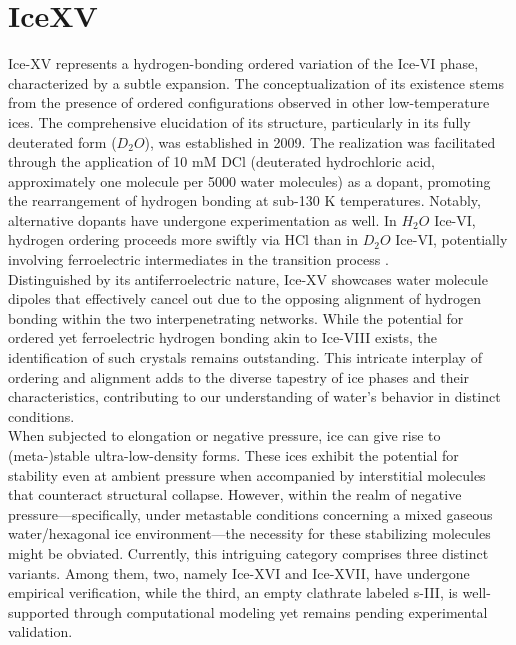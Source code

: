 \section{IceXV}
Ice-XV represents a hydrogen-bonding ordered variation of the Ice-VI phase, characterized by a subtle expansion. The conceptualization of its existence stems from the presence of ordered configurations observed in other low-temperature ices. The comprehensive elucidation of its structure, particularly in its fully deuterated form ($D_2O$), was established in 2009\cite{Salzmann_2009}. The realization was facilitated through the application of 10 mM DCl (deuterated hydrochloric acid, approximately one molecule per 5000 water molecules) as a dopant, promoting the rearrangement of hydrogen bonding at sub-130 K temperatures. Notably, alternative dopants have undergone experimentation as well\cite{RosuFinsen2018}. In $H_2O$ Ice-VI, hydrogen ordering proceeds more swiftly via HCl than in $D_2O$ Ice-VI, potentially involving ferroelectric intermediates in the transition process \cite{Shephard2015}.\\
Distinguished by its antiferroelectric nature, Ice-XV showcases water molecule dipoles that effectively cancel out due to the opposing alignment of hydrogen bonding within the two interpenetrating networks. While the potential for ordered yet ferroelectric hydrogen bonding akin to Ice-VIII exists, the identification of such crystals remains outstanding. This intricate interplay of ordering and alignment adds to the diverse tapestry of ice phases and their characteristics, contributing to our understanding of water's behavior in distinct conditions.\\
When subjected to elongation or negative pressure, ice can give rise to (meta-)stable ultra-low-density forms. These ices exhibit the potential for stability even at ambient pressure when accompanied by interstitial molecules that counteract structural collapse. However, within the realm of negative pressure—specifically, under metastable conditions concerning a mixed gaseous water/hexagonal ice environment—the necessity for these stabilizing molecules might be obviated. Currently, this intriguing category comprises three distinct variants. Among them, two, namely Ice-XVI and Ice-XVII, have undergone empirical verification, while the third, an empty clathrate labeled s-III, is well-supported through computational modeling yet remains pending experimental validation.

